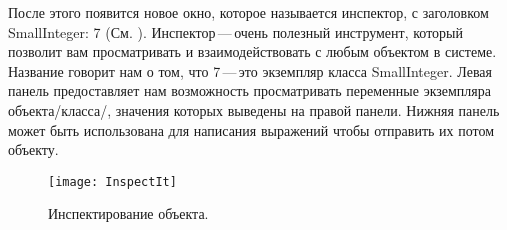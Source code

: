 \documentclass[a4paper,10pt,twoside]{book}
\begin{document}


\noindent
После этого появится новое окно, которое называется инспектор,
с заголовком SmallInteger: 7 (См. ).
Инспектор\,---\,очень полезный инструмент, который позволит
вам просматривать и взаимодействовать с любым объектом в системе.
Название говорит нам о том, что 7\,---\,это экземпляр класса SmallInteger.
Левая панель предоставляет нам возможность просматривать переменные
экземпляра объекта/класса/, значения которых выведены на правой
панели. Нижняя панель может быть  использована  для написания
выражений чтобы отправить их потом объекту.

\begin{figure}[htb]
\centerline {\texttt{[image: InspectIt]}}
\caption{Инспектирование объекта. }
\end{figure}





\end{document}
